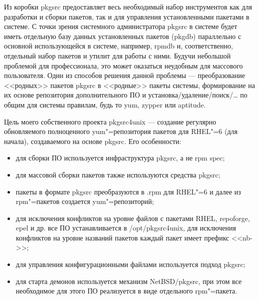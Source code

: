 \documentclass[10pt, a5paper]{article}
\begin{document}
Из коробки pkgsrc предоставляет весь необходимый набор инструментов как для разработки и сборки пакетов, так и для управления установленными пакетами в системе. С точки зрения системного администратора pkgsrc в системе будет иметь отдельную базу данных установленных пакетов (pkgdb) параллельно с основной использующейся в системе, например, rpmdb и, соответственно, отдельный набор пакетов и утилит для работы с ними. Будучи небольшой проблемой для профессионала, это может оказаться неудобным для массового пользователя. Один из способов решения данной проблемы --- преобразование <<родных>> пакетов pkgsrc в <<родные>> пакеты системы, формирование на их основе репозитория дополнительного ПО и установка/удаление/поиск/\ldots{} по общим для системы правилам, будь то yum, zypper или aptitude.

Цель моего собственного проекта pkgsrc4unix --- создание регулярно обновляемого полноценного yum"=репозитория пакетов для RHEL"=6 (для начала), создаваемого на основе pkgsrc. Его особенности: 
\begin{itemize}
\item для сборки ПО используется инфраструктура pkgsrc, а не rpm spec; 
\item для массовой сборки пакетов также используются средства pkgsrc; 
\item пакеты в формате pkgsrc преобразуются в .rpm для RHEL"=6 и далее из rpm"=пакетов создается yum"=репозиторий; 
\item для исключения конфликтов на уровне файлов с пакетами RHEL, repoforge, epel и др. все ПО устанавливается в \linebreak /opt/pkgsrc4unix, для исключения конфликтов на уровне названий пакетов каждый пакет имеет префикс <<nb->>; 
\item для управления конфигурационными файлами используется подход pkgsrc; 
\item для старта демонов используется механизм NetBSD/pkgsrc, при этом все необходимое для этого ПО реализуется в виде отдельного rpm"=пакета.
\end{itemize}
\end{document}
